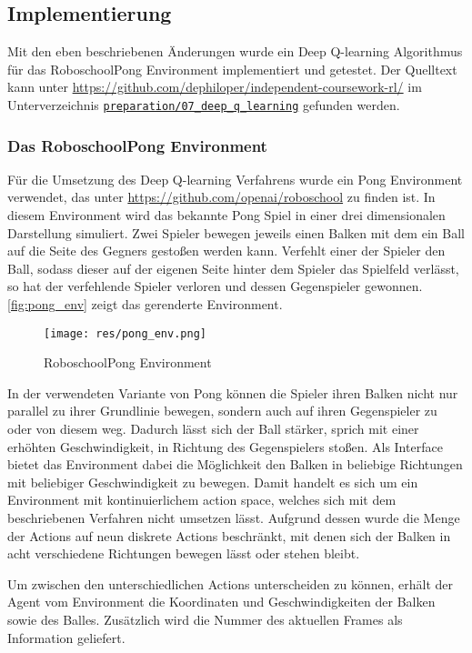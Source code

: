 \documentclass[11pt]{scrartcl}
\begin{document}
\subsection{Implementierung}
Mit den eben beschriebenen Änderungen wurde ein Deep Q-learning Algorithmus für das
RoboschoolPong Environment implementiert und getestet. Der Quelltext kann unter
\url{https://github.com/dephiloper/independent-coursework-rl/} im Unterverzeichnis
\href{https://github.com/dephiloper/independent-coursework-rl/tree/master/preparation/07_deep_q_learning}
{\nolinkurl{preparation/07\_deep\_q\_learning}} gefunden werden.


\subsubsection{Das RoboschoolPong Environment}
Für die Umsetzung des Deep Q-learning Verfahrens wurde ein Pong Environment verwendet, das
unter \url{https://github.com/openai/roboschool} zu finden ist. In diesem Environment wird
das bekannte Pong Spiel in einer drei dimensionalen Darstellung simuliert. Zwei Spieler
bewegen jeweils einen Balken mit dem ein Ball auf die Seite des Gegners gestoßen werden
kann. Verfehlt einer der Spieler den Ball, sodass dieser auf der eigenen Seite hinter dem
Spieler das Spielfeld verlässt, so hat der verfehlende Spieler verloren und dessen
Gegenspieler gewonnen. \autoref{fig:pong_env} zeigt das gerenderte Environment.

\begin{figure}[htp]
\centering
\texttt{[image: res/pong\_env.png]}
\caption{RoboschoolPong Environment}
\label{fig:pong_env}
\end{figure}
\noindent
In der verwendeten Variante von Pong können die Spieler ihren Balken nicht nur parallel zu
ihrer Grundlinie bewegen, sondern auch auf ihren Gegenspieler zu oder von diesem weg.
Dadurch lässt sich der Ball stärker, sprich mit einer erhöhten Geschwindigkeit, in Richtung
des Gegenspielers stoßen. Als Interface bietet das Environment dabei die Möglichkeit den
Balken in beliebige Richtungen mit beliebiger Geschwindigkeit zu bewegen. Damit handelt es
sich um ein Environment mit kontinuierlichem action space, welches sich mit dem
beschriebenen Verfahren nicht umsetzen lässt. Aufgrund dessen wurde die Menge der Actions auf
neun diskrete Actions beschränkt, mit denen sich der Balken in acht verschiedene Richtungen
bewegen lässt oder stehen bleibt.

Um zwischen den unterschiedlichen Actions unterscheiden zu können, erhält der Agent vom
Environment die Koordinaten und Geschwindigkeiten der Balken sowie des Balles. Zusätzlich
wird die Nummer des aktuellen Frames als Information geliefert.
\end{document}
